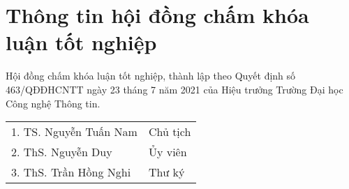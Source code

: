 \chapter*{\centering\Large{Thông tin hội đồng chấm khóa luận tốt nghiệp}}
Hội đồng chấm khóa luận tốt nghiệp, thành lập theo Quyết định số 463/QĐĐHCNTT ngày 23 tháng 7 năm 2021 của Hiệu trưởng Trường Đại học Công nghệ
Thông tin.
\begin{center}
    \begin{tabular}{ p{} p{}} 
        1. TS. Nguyễn Tuấn Nam  & Chủ tịch \\
        2. ThS. Nguyễn Duy   & Ủy viên \\ 
        3. ThS. Trần Hồng Nghi & Thư ký \\ 
    \end{tabular} 
\end{center}


